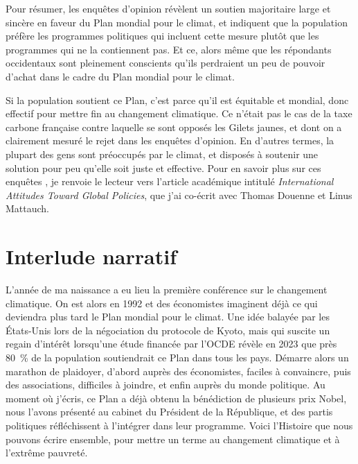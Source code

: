 \documentclass[a5paper,french,openany]{memoir}
\begin{document}
Pour résumer, les enquêtes d'opinion révèlent un soutien majoritaire large et sincère en faveur du Plan mondial pour le climat, et indiquent que la population préfère les programmes politiques qui incluent cette mesure plutôt que les programmes qui ne la contiennent pas. Et ce, alors même que les répondants occidentaux sont pleinement conscients qu'ils perdraient un peu de pouvoir d'achat dans le cadre du Plan mondial pour le climat. 

Si la population soutient ce Plan, c'est parce qu'il est équitable et mondial, donc effectif pour mettre fin au changement climatique. Ce n'était pas le cas de la taxe carbone française contre laquelle se sont opposés les Gilets jaunes, et dont on a clairement mesuré le rejet dans les enquêtes d'opinion. En d'autres termes, la plupart des gens sont préoccupés par le climat, et disposés à soutenir une solution pour peu qu'elle soit juste et effective. 
Pour en savoir plus sur ces enquêtes%
, je renvoie le lecteur vers l'article académique intitulé \textit{International Attitudes Toward Global Policies}, que j'ai co-écrit avec Thomas Douenne et Linus Mattauch. 

\chapter{Interlude narratif}

L'année de ma naissance a eu lieu la première conférence sur le changement climatique. On est alors en 1992 et des économistes imaginent déjà ce qui deviendra plus tard le Plan mondial pour le climat. Une idée balayée par les États-Unis lors de la négociation du protocole de Kyoto, mais qui suscite un regain d'intérêt lorsqu'une étude financée par l'OCDE révèle en 2023 que près 80~\% de la population soutiendrait ce Plan dans tous les pays. Démarre alors un marathon de plaidoyer, d'abord auprès des économistes, faciles à convaincre, puis des associations, difficiles à joindre, 
et enfin auprès du monde politique. Au moment où j'écris, ce Plan a déjà obtenu la bénédiction de plusieurs prix Nobel, nous l'avons présenté au cabinet du Président de la République, et des partis politiques réfléchissent à l'intégrer dans leur programme. Voici l'Histoire que nous pouvons écrire ensemble, pour mettre un terme au changement climatique et à l'extrême pauvreté. 
\end{document}
